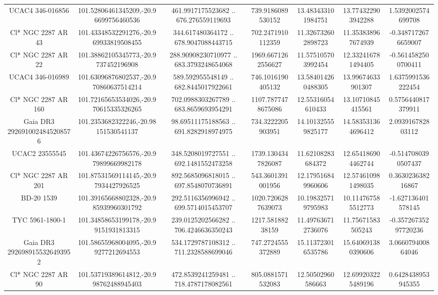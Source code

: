 \begin{table}
\begin{tabular}{ccccccc}
UCAC4 346-016856 & 101.52806461345209,-20.96699756460536 & 461.9917175523682 .. 676.276559119693 & 739.9186089530152 & 13.483433101984751 & 13.774322903942288 & 1.5392002574699708 \\
Cl* NGC 2287     AR      43 & 101.43348532291276,-20.969933819508455 & 344.617480364172 .. 678.9047088443715 & 702.2471910112359 & 11.326732602898723 & 11.353838967674939 & -0.3487172676659007 \\
Cl* NGC 2287     AR      22 & 101.38862105345773,-20.9737452196908 & 288.90908230710977 .. 683.3793248654068 & 1969.6671262556627 & 11.575105703992454 & 12.332416781494405 & -0.5614582500700411 \\
UCAC4 346-016989 & 101.63096876802537,-20.970860637514214 & 589.592955548149 .. 682.8445017922661 & 746.1016190405132 & 13.584014260488305 & 13.99674633901307 & 1.6375991536222454 \\
Cl* NGC 2287     AR     160 & 101.72165653534026,-20.970615335326265 & 702.0988303267789 .. 683.8659693954291 & 1107.7877478675086 & 12.55316054610433 & 13.10710845415561 & 0.5756440817379911 \\
Gaia DR3 2926910024845208576 & 101.2353682322246,-20.98151530541137 & 98.69511175188563 .. 691.8282918974975 & 734.3222205903951 & 14.101325559825177 & 14.583531364696412 & 2.093916782803112 \\
UCAC2  23555545 & 101.43674226756576,-20.979899669982178 & 348.5208019727551 .. 692.1481552473258 & 1739.1304347826087 & 11.62108283684372 & 12.654186904462744 & -0.5147080390507437 \\
Cl* NGC 2287     AR     201 & 101.87531569114145,-20.97934427926525 & 892.5685096818015 .. 697.8548070736891 & 543.3601391001956 & 12.179516849960606 & 12.574610981498035 & 0.363023638216867 \\
BD-20  1539 & 101.39165668802328,-20.985939960301792 & 292.5116356996942 .. 699.5714015453707 & 1020.7206287639073 & 10.198325719795983 & 10.114767585512773 & -1.627136401578145 \\
TYC 5961-1800-1 & 101.34858653199178,-20.99151931813315 & 239.0125202566282 .. 706.4246636350243 & 1217.58188238159 & 11.497636712736076 & 11.75671583505243 & -0.35726735297720236 \\
Gaia DR3 2926989155326493952 & 101.58655968004095,-20.99277212694553 & 534.1729787108312 .. 711.2328588699046 & 747.2724555372889 & 15.113723016535786 & 15.640691380390606 & 3.066079400864046 \\
Cl* NGC 2287     AR      90 & 101.53719389614812,-20.998762488945403 & 472.8539241259481 .. 718.4787178082561 & 805.0881571532083 & 12.50502960586663 & 12.699203225489196 & 0.6428438953945355 \\

\end{tabular}
\end{table}
